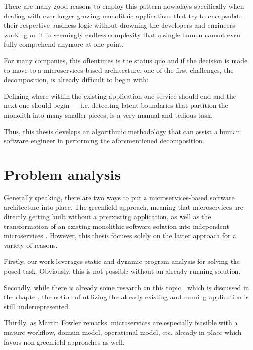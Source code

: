 \documentclass[12pt,a4paper]{report}
\begin{document}
There are many good reasons to employ this pattern nowadays specifically
when dealing with ever larger growing monolithic applications that try to
encapsulate their respective business logic without drowning the
developers and engineers working on it in seemingly endless complexity
that a single human cannot even fully comprehend anymore at one point.

For many companies, this oftentimes is the status quo and if the decision is
made to move to a microservices\hyp based architecture, one of the first
challenges, the decomposition, is already difficult to begin with:

Defining where within the existing application one service should end and the
next one should begin --- i.e. detecting latent boundaries that partition
the monolith into many smaller pieces, is a very manual and tedious task.

Thus, this thesis develops an algorithmic methodology that can assist
a human software engineer in performing the aforementioned decomposition.



\section{Problem analysis}

Generally speaking, there are two ways to put a microservices\hyp based
software architecture into place. The greenfield approach, meaning that
microservices are directly getting built without a preexisting application,
as well as the transformation of an existing monolithic software solution
into independent microservices \cite{fowler-break-monolith}.
However, this thesis focuses solely on the latter approach for a variety of reasons.

Firstly, our work leverages static and dynamic program analysis for solving
the posed task. Obviously, this is not possible without an already running solution.

Secondly, while there is already some research on this topic \cite{fritzsch2018monolith},
which is discussed in the \textit{} chapter, the notion
of utilizing the already existing and running application is still underrepresented.

Thirdly, as Martin Fowler remarks, microservices are especially feasible
with a mature workflow, domain model, operational model, etc. already
in place \cite{fowler-monolith-first, fowler-microservices-tradeoffs}
which favors non\hyp greenfield approaches as well.
\end{document}
